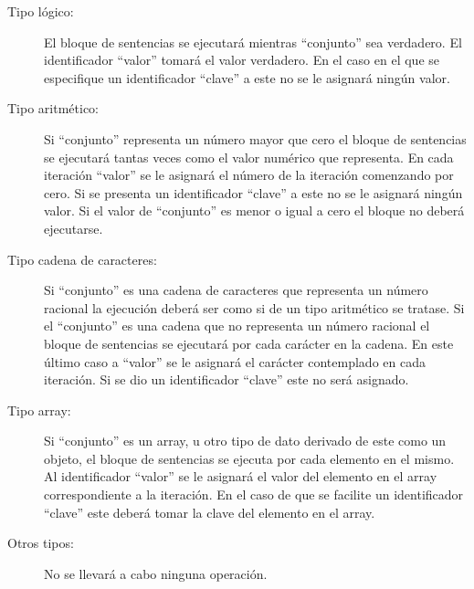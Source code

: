 \begin{framed}
\begin{description}
		\begin{description}
			\item [Tipo lógico:] El bloque de sentencias se ejecutará mientras ``conjunto'' sea verdadero. El identificador ``valor'' tomará
			el valor verdadero. En el caso en el que se especifique un identificador ``clave'' a este no se le asignará ningún valor.
			\item [Tipo aritmético:] Si ``conjunto'' representa un número mayor que cero el bloque de sentencias se ejecutará
			tantas veces como el valor numérico que representa. En cada iteración ``valor'' se le asignará el número de la iteración
			comenzando por cero. Si se presenta un identificador ``clave'' a este no se le asignará ningún valor.
			Si el valor de ``conjunto'' es menor o igual a cero el bloque no deberá ejecutarse.
			\item [Tipo cadena de caracteres:] Si ``conjunto'' es una cadena de caracteres que representa un número racional la
			ejecución deberá ser como si de un tipo aritmético se tratase. Si el ``conjunto'' es una cadena que no representa un número racional
			el bloque de sentencias se ejecutará por cada carácter en la cadena. En este último caso a ``valor'' se le asignará el carácter
			contemplado en cada iteración. Si se dio un identificador ``clave'' este no será asignado.
			\item [Tipo array:] Si ``conjunto'' es un array, u otro tipo de dato derivado de este como un objeto, el bloque de sentencias
			se ejecuta por cada elemento en el mismo. Al identificador ``valor'' se le asignará el valor del elemento en el array correspondiente
			a la iteración. En el caso de que se facilite un identificador ``clave'' este deberá tomar la clave del elemento en el array.
			\item [Otros tipos:] No se llevará a cabo ninguna operación.
		\end{description}
	\end {description}
\end{framed}

